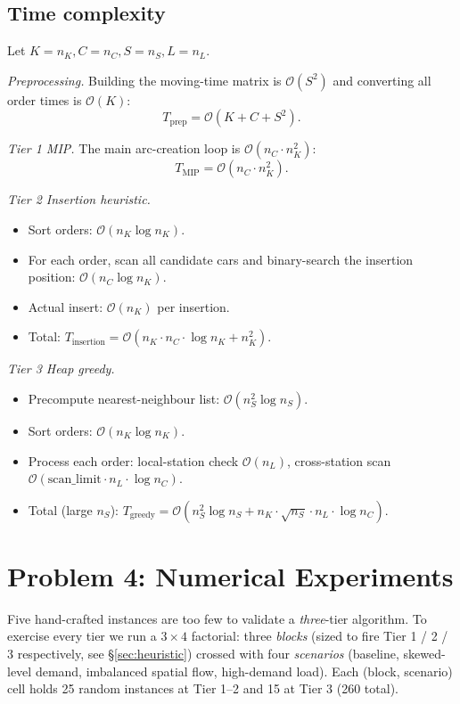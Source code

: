 \documentclass[a4paper, 12pt]{article}
\begin{document}
\subsection{Time complexity}

Let $K = n_K, C = n_C, S = n_S, L = n_L$.

\smallskip
\noindent\textit{Preprocessing.} Building the moving-time matrix is $\mathcal{O}(S^2)$ and converting all order times is $\mathcal{O}(K)$:
\[ T_{\text{prep}} = \mathcal{O}(K + C + S^2). \]

\noindent\textit{Tier 1 MIP.} The main arc-creation loop is $\mathcal{O}(n_C\cdot n_K^2)$:
\[ T_{\text{MIP}} = \mathcal{O}(n_C\cdot n_K^2). \]

\noindent\textit{Tier 2 Insertion heuristic.}
\begin{itemize}
    \item Sort orders: $\mathcal{O}(n_K\log n_K)$.
    \item For each order, scan all candidate cars and binary-search the insertion position: $\mathcal{O}(n_C\log n_K)$.
    \item Actual insert: $\mathcal{O}(n_K)$ per insertion.
    \item Total: $T_{\text{insertion}} = \mathcal{O}(n_K\cdot n_C\cdot \log n_K + n_K^2)$.
\end{itemize}

\noindent\textit{Tier 3 Heap greedy.}
\begin{itemize}
    \item Precompute nearest-neighbour list: $\mathcal{O}(n_S^2\log n_S)$.
    \item Sort orders: $\mathcal{O}(n_K\log n_K)$.
    \item Process each order: local-station check $\mathcal{O}(n_L)$, cross-station scan $\mathcal{O}(\text{scan\_limit}\cdot n_L\cdot \log n_C)$.
    \item Total (large $n_S$): $T_{\text{greedy}} = \mathcal{O}(n_S^2\log n_S + n_K\cdot \sqrt{n_S}\cdot n_L\cdot \log n_C)$.
\end{itemize}

\section{Problem 4: Numerical Experiments}\label{sec:p4}

Five hand-crafted instances are too few to validate a \emph{three}-tier algorithm. To exercise every tier we run a $3\times 4$ factorial: three \emph{blocks} (sized to fire Tier 1 / 2 / 3 respectively, see \S\ref{sec:heuristic}) crossed with four \emph{scenarios} (baseline, skewed-level demand, imbalanced spatial flow, high-demand load). Each (block, scenario) cell holds 25 random instances at Tier 1--2 and 15 at Tier 3 (260 total).
\end{document}

